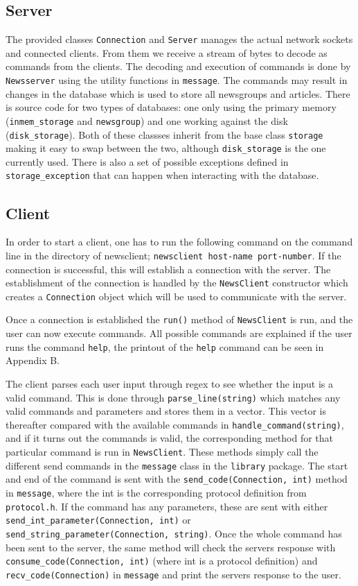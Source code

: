 \documentclass[a4paper]{article}
\begin{document}
\subsection{Server}
\label{subsec:server}
The provided classes \texttt{Connection} and \texttt{Server} manages the actual network sockets and connected clients. From them we receive a stream of bytes to decode as commands from the clients. The decoding and execution of commands is done by \texttt{Newsserver} using the utility functions in \texttt{message}. The commands may result in changes in the database which is used to store all newsgroups and articles. There is source code for two types of databases: one only using the primary memory (\texttt{inmem\_storage} and \texttt{newsgroup}) and one working against the disk (\texttt{disk\_storage}). Both of these classses inherit from the base class \texttt{storage} making it easy to swap between the two, although \texttt{disk\_storage} is the one currently used. There is also a set of possible exceptions defined in \texttt{storage\_exception} that can happen when interacting with the database.


\subsection{Client}
\label{subsec:client}
In order to start a client, one has to run the following command on the command line in the directory of newsclient; \texttt{newsclient host-name port-number}. If the connection is successful, this will establish a connection with the server. The establishment of the connection is handled by the \texttt{NewsClient} constructor which creates a \texttt{Connection} object which will be used to communicate with the server.

Once a connection is established the \texttt{run()} method of \texttt{NewsClient} is run, and the user can now execute commands. All possible commands are explained if the user runs the command \texttt{help}, the printout of the \texttt{help} command can be seen in Appendix B.

The client parses each user input through regex to see whether the input is a valid command. This is done through \texttt{parse\_line(string)} which matches any valid commands and parameters and stores them in a vector. This vector is thereafter compared with the available commands in \texttt{handle\_command(string)}, and if it turns out the commands is valid, the corresponding method for that particular command is run in \texttt{NewsClient}. These methods simply call the different send commands in the \texttt{message} class in the \texttt{library} package. The start and end of the command is sent with the \texttt{send\_code(Connection, int)} method in \texttt{message}, where the int is the corresponding protocol definition from \texttt{protocol.h}. If the command has any parameters, these are sent with either \texttt{send\_int\_parameter(Connection, int)} or \texttt{send\_string\_parameter(Connection, string)}. Once the whole command has been sent to the server, the same method will check the servers response with \texttt{consume\_code(Connection, int)} (where int is a protocol definition) and \texttt{recv\_code(Connection)} in \texttt{message} and print the servers response to the user.
\end{document}
